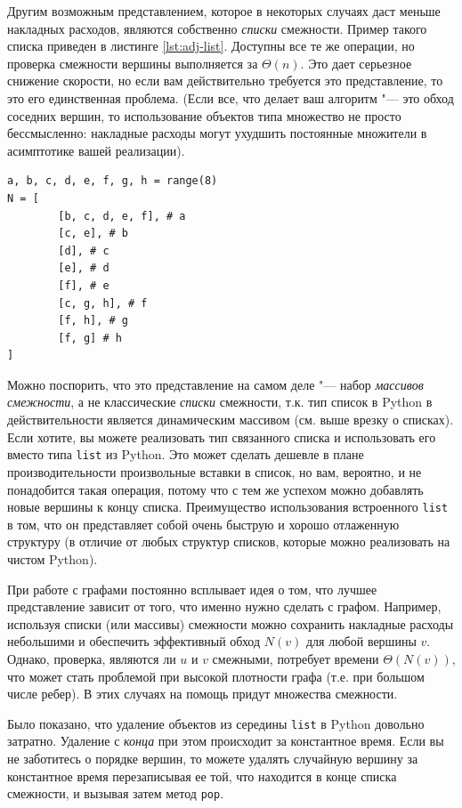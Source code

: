 Другим возможным представлением, которое в некоторых случаях даст меньше накладных расходов, являются собственно \textit{списки} смежности. Пример такого списка приведен в листинге \ref{lst:adj-list}. Доступны все те же операции, но проверка смежности вершины выполняется за $\Theta(n)$. Это дает серьезное снижение скорости, но если вам действительно требуется это представление, то это его единственная проблема. (Если все, что делает ваш алгоритм "--- это обход соседних вершин, то использование объектов типа множество не просто бессмысленно: накладные расходы могут ухудшить постоянные множители в асимптотике вашей реализации).

\begin{lstlisting}[caption={Списки смежности}, label={lst:adj-list}]
a, b, c, d, e, f, g, h = range(8)
N = [
		[b, c, d, e, f], # a
		[c, e], # b
		[d], # c
		[e], # d
		[f], # e
		[c, g, h], # f
		[f, h], # g
		[f, g] # h
]
\end{lstlisting}

Можно поспорить, что это представление на самом деле "--- набор \textit{массивов смежности}, а не классические \textit{списки} смежности, т.к. тип список в Python в действительности является динамическим массивом (см. выше врезку о списках). Если хотите, вы можете реализовать тип связанного списка и использовать его вместо типа \texttt{list} из Python. Это может сделать дешевле в плане производительности произвольные вставки в список, но вам, вероятно, и не понадобится такая операция, потому что с тем же успехом можно добавлять новые вершины к концу списка. Преимущество использования встроенного \texttt{list} в том, что он представляет собой очень быструю и хорошо отлаженную структуру (в отличие от любых структур списков, которые можно реализовать на чистом Python).

При работе с графами постоянно всплывает идея о том, что лучшее представление зависит от того, что именно нужно сделать с графом. Например, используя списки (или массивы) смежности можно сохранить накладные расходы небольшими и обеспечить эффективный обход $N(v)$ для любой вершины $v$. Однако, проверка, являются ли $u$ и $v$ смежными, потребует времени $\Theta(N(v))$, что может стать проблемой при высокой плотности графа (т.е. при большом числе ребер). В этих случаях на помощь придут множества смежности. 

\begin{note}[Совет:]
Было показано, что удаление объектов из середины \texttt{list} в Python довольно затратно. Удаление с \textit{конца} при этом происходит за константное время. Если вы не заботитесь о порядке вершин, то можете удалять случайную вершину за константное время перезаписывая ее той, что находится в конце списка смежности, и вызывая затем метод \texttt{pop}.
\end{note}

